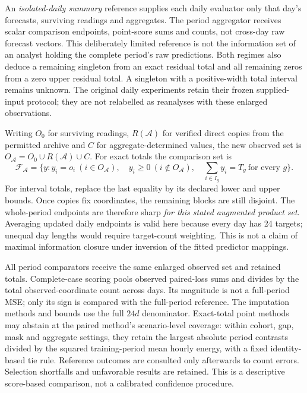 \documentclass[12pt]{article}
\newcommand{\F}{\mathcal{F}}
\begin{document}
An \emph{isolated-daily summary} reference supplies each daily evaluator
only that day's forecasts, surviving readings and aggregates. The period
aggregator receives scalar comparison endpoints, point-score sums and
counts, not cross-day raw forecast vectors. This deliberately limited
reference is not the information set of an analyst holding the complete
period's raw predictions. Both regimes also deduce a remaining singleton
from an exact residual total and all remaining zeros from a zero upper
residual total. A singleton with a positive-width total interval remains
unknown. The original daily experiments retain their frozen supplied-input
protocol; they are not relabelled as reanalyses with these enlarged observations.

Writing $O_0$ for surviving readings, $R(\mathcal A)$ for verified direct
copies from the permitted archive and $C$ for aggregate-determined values,
the new observed set is $O_{\mathcal A}=O_0\cup R(\mathcal A)\cup C$.
For exact totals the comparison set is
\begin{equation}
 \F_{\mathcal A}=\{y:y_i=o_i\ (i\in O_{\mathcal A}),\quad
 y_i\geq0\ (i\notin O_{\mathcal A}),\quad
 \textstyle\sum_{i\in I_g}y_i=T_g\ \text{for every }g\}.
 \label{eq:archive-set}
\end{equation}
For interval totals, replace the last equality by its declared lower and
upper bounds. Once copies fix coordinates, the remaining blocks are still
disjoint. The whole-period endpoints are therefore sharp \emph{for this
stated augmented product set}. Averaging updated daily endpoints is valid
here because every day has 24 targets; unequal day lengths would require
target-count weighting. This is not a claim of maximal information closure
under inversion of the fitted predictor mappings.

All period comparators receive the same enlarged observed set and retained
totals. Complete-case scoring pools observed paired-loss sums and divides
by the total observed-coordinate count across days. Its magnitude is not
a full-period MSE; only its sign is compared with the full-period reference.
The imputation methods and bounds use the full $24d$ denominator. Exact-total
point methods may abstain at the paired method's scenario-level coverage:
within cohort, gap, mask and aggregate settings, they retain the largest
absolute period contrasts divided by the squared training-period mean
hourly energy, with a fixed identity-based tie rule.
Reference outcomes are consulted only afterwards to count errors. Selection
shortfalls and unfavorable results are retained. This is a descriptive
score-based comparison, not a calibrated confidence procedure.
\end{document}
